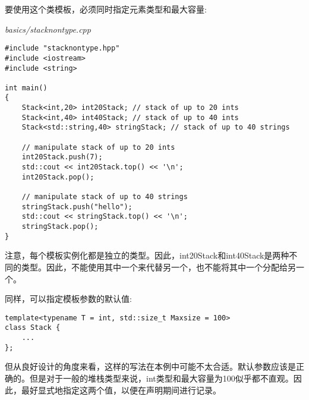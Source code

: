 要使用这个类模板，必须同时指定元素类型和最大容量:

\noindent
\textit{basics/stacknontype.cpp}
\begin{lstlisting}[style=styleCXX]
#include "stacknontype.hpp"
#include <iostream>
#include <string>

int main()
{
	Stack<int,20> int20Stack; // stack of up to 20 ints
	Stack<int,40> int40Stack; // stack of up to 40 ints
	Stack<std::string,40> stringStack; // stack of up to 40 strings
	
	// manipulate stack of up to 20 ints
	int20Stack.push(7);
	std::cout << int20Stack.top() << '\n';
	int20Stack.pop();
	
	// manipulate stack of up to 40 strings
	stringStack.push("hello");
	std::cout << stringStack.top() << '\n';
	stringStack.pop();
}
\end{lstlisting}

注意，每个模板实例化都是独立的类型。因此，int20Stack和int40Stack是两种不同的类型。因此，不能使用其中一个来代替另一个，也不能将其中一个分配给另一个。

同样，可以指定模板参数的默认值:

\begin{lstlisting}[style=styleCXX]
template<typename T = int, std::size_t Maxsize = 100>
class Stack {
	...
};
\end{lstlisting}

但从良好设计的角度来看，这样的写法在本例中可能不太合适。默认参数应该是正确的。但是对于一般的堆栈类型来说，int类型和最大容量为100似乎都不直观。因此，最好显式地指定这两个值，以便在声明期间进行记录。





























